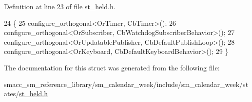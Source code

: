 Definition at line 23 of file st\+\_\+held.\+h.


\begin{DoxyCode}
24     \{
25         configure\_orthogonal<OrTimer, CbTimer>();   
26         configure\_orthogonal<OrSubscriber, CbWatchdogSubscriberBehavior>();
27         configure\_orthogonal<OrUpdatablePublisher, CbDefaultPublishLoop>();
28         configure\_orthogonal<OrKeyboard, CbDefaultKeyboardBehavior>();
29     \}
\end{DoxyCode}


The documentation for this struct was generated from the following file\+:\begin{DoxyCompactItemize}
\item 
smacc\+\_\+sm\+\_\+reference\+\_\+library/sm\+\_\+calendar\+\_\+week/include/sm\+\_\+calendar\+\_\+week/states/\hyperlink{sm__calendar__week_2include_2sm__calendar__week_2states_2st__held_8h}{st\+\_\+held.\+h}\end{DoxyCompactItemize}
